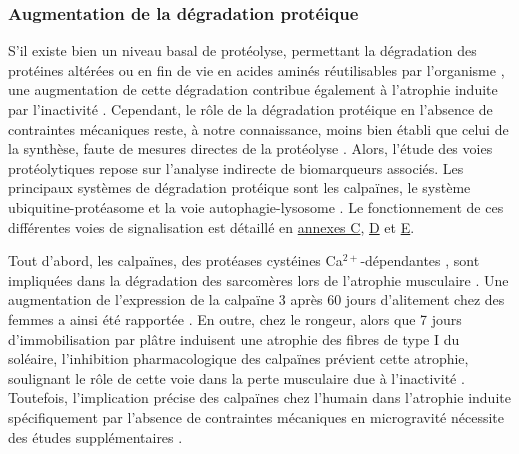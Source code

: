 \documentclass[11pt]{report}
\begin{document}
\subsubsection{Augmentation de la dégradation protéique}

S'il existe bien un niveau basal de protéolyse, permettant la dégradation des protéines altérées ou en fin de vie en acides aminés réutilisables par l'organisme \parencite{Mitchell2016Jul,Poortmans2012Oct}, une augmentation de cette dégradation contribue également à l'atrophie induite par l'inactivité \parencite{liu_mechanisms_2024}. Cependant, le rôle de la dégradation protéique en l'absence de contraintes mécaniques reste, à notre connaissance, moins bien établi que celui de la synthèse, faute de mesures directes de la protéolyse \parencite{Gao2018Mar}. Alors, l'étude des voies protéolytiques repose sur l'analyse indirecte de biomarqueurs associés. Les principaux systèmes de dégradation protéique sont les calpaïnes, le système ubiquitine-protéasome et la voie autophagie-lysosome \parencite{Scicchitano2015}. Le fonctionnement de ces différentes voies de signalisation est détaillé en \hyperref[annexeC]{annexes C}, \hyperref[annexeD]{D} et \hyperref[annexeE]{E}.

Tout d'abord, les calpaïnes, des protéases cystéines Ca$^{2+}$-dépendantes \parencite{Goll2003Jul}, sont impliquées dans la dégradation des sarcomères lors de l'atrophie musculaire \parencite{Huang2016Nov}. Une augmentation de l'expression de la calpaïne 3 après 60 jours d'alitement chez des femmes a ainsi été rapportée \parencite{Chopard2009Aug}. En outre, chez le rongeur, alors que 7 jours d'immobilisation par plâtre induisent une atrophie des fibres de type I du soléaire, l'inhibition pharmacologique des calpaïnes prévient cette atrophie, soulignant le rôle de cette voie dans la perte musculaire due à l'inactivité \parencite{Talbert2013May}. Toutefois, l'implication précise des calpaïnes chez l'humain dans l'atrophie induite spécifiquement par l'absence de contraintes mécaniques en microgravité nécessite des études supplémentaires \parencite{bosutti_microgravity-induced_2025,Chopard2009Sep}.
\end{document}
